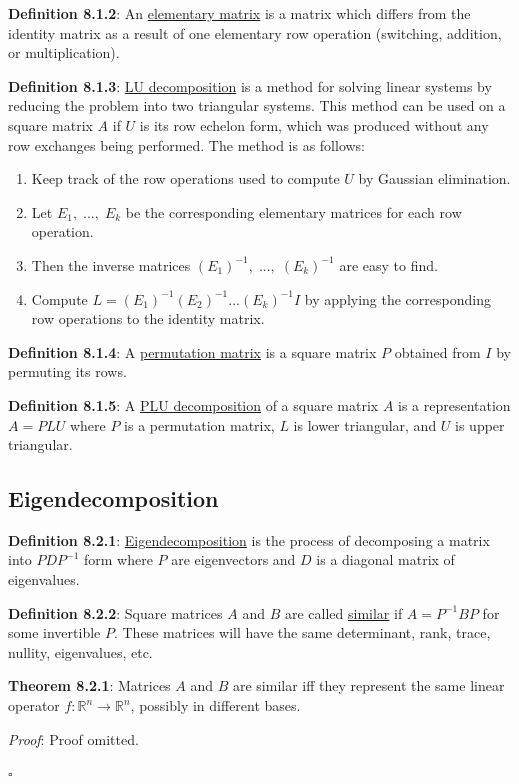 \documentclass{article}
\newcommand{\separate}[1] {\vspace{#1 pt}\noindent}
\newcommand{\R}{\mathbb{R}}
\newcommand{\definition}[2]{\textbf{Definition #1}: #2\label{def:#1}}
\newcommand{\proof}[2]{\textit{Proof}: #2 \begin{flushright}\(\square\)\end{flushright}\label{prf:#1}}
\newcommand{\theorem}[3]{\textbf{Theorem #1}: #2 \par\separate{3}\proof{thm:#1}{#3}\label{thm:#1}}
\begin{document}
\separate{7}\definition{8.1.2}{An \underline{elementary matrix} is a matrix which differs from the identity matrix as a result of one elementary row operation (switching, addition, or multiplication).}

\separate{7}\definition{8.1.3}{\underline{LU decomposition} is a method for solving linear systems by reducing the problem into two triangular systems. This method can be used on a square matrix \(A\) if \(U\) is its row echelon form, which was produced without any row exchanges being performed. The method is as follows:}
\begin{enumerate}
    \item Keep track of the row operations used to compute \(U\) by Gaussian elimination.
    \item Let \(E_1,\;...,\;E_k\) be the corresponding elementary matrices for each row operation.
    \item Then the inverse matrices \((E_1)^{-1},\;...,\;(E_k)^{-1}\) are easy to find.
    \item Compute \(L = (E_1)^{-1} (E_2)^{-1} ... (E_k)^{-1} I\) by applying the corresponding row operations to the identity matrix.
\end{enumerate}

\separate{7}\definition{8.1.4}{A \underline{permutation matrix} is a square matrix \(P\) obtained from \(I\) by permuting its rows.}

\separate{7}\definition{8.1.5}{A \underline{PLU decomposition} of a square matrix \(A\) is a representation \(A=PLU\) where \(P\) is a permutation matrix, \(L\) is lower triangular, and \(U\) is upper triangular.}

\subsection{Eigendecomposition}

\definition{8.2.1}{\underline{Eigendecomposition} is the process of decomposing a matrix into \(PDP^{-1}\) form where \(P\) are eigenvectors and \(D\) is a diagonal matrix of eigenvalues.}

\separate{7}\definition{8.2.2}{Square matrices \(A\) and \(B\) are called \underline{similar} if \(A=P^{-1}BP\) for some invertible \(P\). These matrices will have the same determinant, rank, trace, nullity, eigenvalues, etc.}

\separate{7}\theorem{8.2.1}{Matrices \(A\) and \(B\) are similar iff they represent the same linear operator \(f:\R^n\rightarrow\R^n\), possibly in different bases.}{Proof omitted.}
\end{document}
